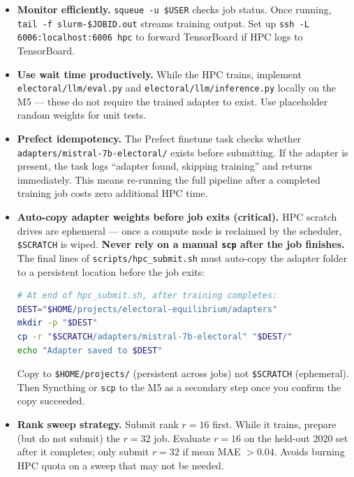 \documentclass[11pt]{article}
\begin{document}
\begin{itemize}[leftmargin=1.6em, itemsep=2pt]
  \item \textbf{Monitor efficiently.} \texttt{squeue -u \$USER} checks job status.
        Once running, \texttt{tail -f slurm-\$JOBID.out} streams training output.
        Set up \texttt{ssh -L 6006:localhost:6006 hpc} to forward TensorBoard
        if HPC logs to TensorBoard.
  \item \textbf{Use wait time productively.} While the HPC trains, implement
        \texttt{electoral/llm/eval.py} and \texttt{electoral/llm/inference.py}
        locally on the M5 --- these do not require the trained adapter to exist.
        Use placeholder random weights for unit tests.
  \item \textbf{Prefect idempotency.} The Prefect finetune task checks whether
        \texttt{adapters/mistral-7b-electoral/} exists before submitting. If the
        adapter is present, the task logs ``adapter found, skipping training'' and
        returns immediately. This means re-running the full pipeline after a
        completed training job costs zero additional HPC time.
  \item \textbf{Auto-copy adapter weights before job exits (critical).} HPC scratch
        drives are ephemeral --- once a compute node is reclaimed by the scheduler,
        \texttt{\$SCRATCH} is wiped. \textbf{Never rely on a manual \texttt{scp}
        after the job finishes.} The final lines of \texttt{scripts/hpc\_submit.sh}
        must auto-copy the adapter folder to a persistent location before the job
        exits:
        \begin{lstlisting}[language=bash]
# At end of hpc_submit.sh, after training completes:
DEST="$HOME/projects/electoral-equilibrium/adapters"
mkdir -p "$DEST"
cp -r "$SCRATCH/adapters/mistral-7b-electoral" "$DEST/"
echo "Adapter saved to $DEST"
        \end{lstlisting}
        Copy to \texttt{\$HOME/projects/} (persistent across jobs) not
        \texttt{\$SCRATCH} (ephemeral). Then Syncthing or \texttt{scp} to the M5
        as a secondary step once you confirm the copy succeeded.
  \item \textbf{Rank sweep strategy.} Submit rank $r=16$ first. While it trains,
        prepare (but do not submit) the $r=32$ job. Evaluate $r=16$ on the held-out
        2020 set after it completes; only submit $r=32$ if mean MAE $> 0.04$.
        Avoids burning HPC quota on a sweep that may not be needed.
\end{itemize}
\end{document}
